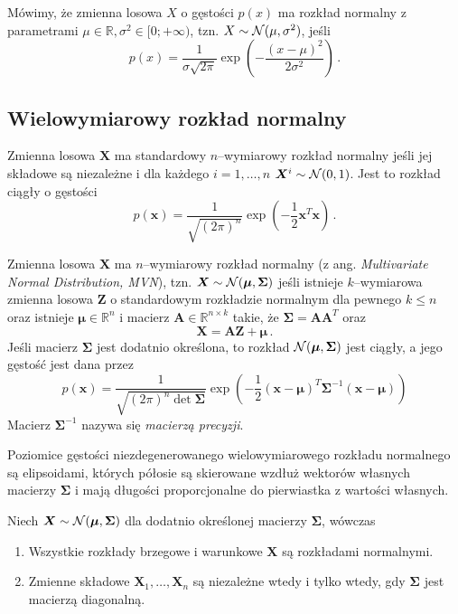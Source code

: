 \documentclass{myclass}
\numberwithin{equation}{subsection}
\begin{document}
\begin{definition}
Mówimy, że zmienna losowa \(X\) o gęstości \(p(x)\) ma rozkład normalny z parametrami \(\mu \in
\mathbb{R} , \sigma^2 \in [0;+\infty)\), tzn. \(X \sim \mathcal{N}(\mu,\sigma^2)\), jeśli    
\[
p(x) = \frac{1}{\sigma\sqrt{2 \pi}} \exp\left(-\frac{(x-\mu)^2}{2\sigma^2}\right)\,.
\]
\end{definition}


\subsection{Wielowymiarowy rozkład normalny}

\begin{definition}
Zmienna losowa \(\bm{X}\) ma standardowy \(n\)--wymiarowy rozkład normalny jeśli jej składowe są
niezależne i dla każdego \(i=1,\ldots,n\) \(\bm{X}^i \sim \mathcal{N}(0,1)\). Jest to rozkład ciągły o
gęstości
\[
p(\bm{x}) = \frac{1}{\sqrt{(2\pi)^n}}\exp\left(-\frac{1}{2}\bm{x}^T\bm{x}\right)\,.
\]
\end{definition}

\begin{definition}
Zmienna losowa \(\bm{X}\) ma \(n\)--wymiarowy rozkład normalny (z ang. \textit{Multivariate Normal
Distribution, MVN}), tzn. \(\bm{X} \sim \mathcal{N}(\bm{\mu}, \bm{\Sigma})\) jeśli istnieje
\(k\)--wymiarowa zmienna losowa \(\bm{Z}\) o standardowym rozkładzie normalnym dla pewnego \(k \leq
n\) oraz istnieje \(\bm{\mu} \in \mathbb{R}^n\) i macierz \(\bm{A} \in \mathbb{R}^{n \times k}\)
takie, że \(\bm{\Sigma} = \bm{A}\bm{A}^T\) oraz
\[
\bm{X} = \bm{A}\bm{Z} + \bm{\mu}\,.
\]
Jeśli macierz \(\bm{\Sigma}\) jest dodatnio określona, to rozkład \(\mathcal{N}(\bm{\mu}, \bm{\Sigma})\)
jest ciągły, a jego gęstość jest dana przez
\[
p(\bm{x}) = \frac{1}{\sqrt{(2\pi)^n\det\bm{\Sigma}}}\exp\left(-\frac{1}{2}(\bm{x}-\bm{\mu})^T\bm{\Sigma}^{-1}(\bm{x}-\bm{\mu})\right)
\]
Macierz \(\bm{\Sigma}^{-1}\) nazywa się \emph{macierzą precyzji}.
\end{definition}

Poziomice gęstości niezdegenerowanego wielowymiarowego rozkładu normalnego są elipsoidami, których
półosie są skierowane wzdłuż wektorów własnych macierzy \(\bm{\Sigma}\) i mają długości
proporcjonalne do pierwiastka z wartości własnych.

\begin{theorem}\label{th:mvn} Niech \(\bm{X} \sim
\mathcal{N}(\bm{\mu}, \bm{\Sigma})\) dla dodatnio określonej macierzy \(\bm{\Sigma}\), wówczas
\begin{enumerate}
\item Wszystkie rozkłady brzegowe i warunkowe \(\bm{X}\) są rozkładami normalnymi.
\item Zmienne składowe \(\bm{X}_1,\ldots,\bm{X}_n\) są niezależne wtedy i tylko wtedy, gdy
\(\bm{\Sigma}\) jest macierzą diagonalną.
\end{enumerate}
\end{theorem}
\end{document}

